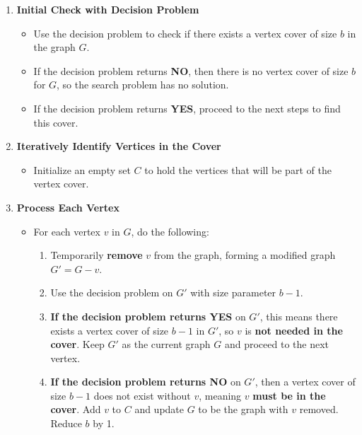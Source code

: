 \documentclass[11pt]{article}
\begin{document}
\begin{enumerate}
    \item \textbf{Initial Check with Decision Problem}
    \begin{itemize}
        \item Use the decision problem to check if there exists a vertex cover of size \( b \) in the graph \( G \).
        \item If the decision problem returns \textbf{NO}, then there is no vertex cover of size \( b \) for \( G \), so the search problem has no solution.
        \item If the decision problem returns \textbf{YES}, proceed to the next steps to find this cover.
    \end{itemize}
    
    \item \textbf{Iteratively Identify Vertices in the Cover}
    \begin{itemize}
        \item Initialize an empty set \( C \) to hold the vertices that will be part of the vertex cover.
    \end{itemize}

    \item \textbf{Process Each Vertex}
    \begin{itemize}
        \item For each vertex \( v \) in \( G \), do the following:
        \begin{enumerate}
            \item Temporarily \textbf{remove} \( v \) from the graph, forming a modified graph \( G' = G - v \).
            \item Use the decision problem on \( G' \) with size parameter \( b-1 \).
            \item \textbf{If the decision problem returns YES} on \( G' \), this means there exists a vertex cover of size \( b-1 \) in \( G' \), so \( v \) is \textbf{not needed in the cover}. Keep \( G' \) as the current graph \( G \) and proceed to the next vertex.
            \item \textbf{If the decision problem returns NO} on \( G' \), then a vertex cover of size \( b-1 \) does not exist without \( v \), meaning \( v \) \textbf{must be in the cover}. Add \( v \) to \( C \) and update \( G \) to be the graph with \( v \) removed. Reduce \( b \) by 1.
        \end{enumerate}
    \end{itemize}


\end{enumerate}
\end{document}

